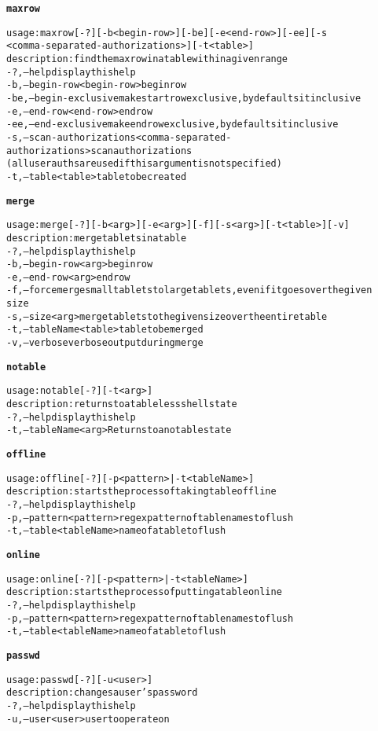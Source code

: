 \begin{alltt}
\textbf{maxrow}

    usage: maxrow [-?] [-b <begin-row>] [-be] [-e <end-row>] [-ee] [-s
              <comma-separated-authorizations>] [-t <table>]
    description: find the max row in a table within a given range
      -?,--help  display this help
      -b,--begin-row <begin-row>  begin row
      -be,--begin-exclusive  make start row exclusive, by defaults it inclusive
      -e,--end-row <end-row>  end row
      -ee,--end-exclusive  make end row exclusive, by defaults it inclusive
      -s,--scan-authorizations <comma-separated-authorizations>  scan authorizations
              (all user auths are used if this argument is not specified)
      -t,--table <table>  table to be created

\textbf{merge}

    usage: merge [-?] [-b <arg>] [-e <arg>] [-f] [-s <arg>] [-t <table>] [-v]
    description: merge tablets in a table
      -?,--help  display this help
      -b,--begin-row <arg>  begin row
      -e,--end-row <arg>  end row
      -f,--force  merge small tablets to large tablets, even if it goes over the given
              size
      -s,--size <arg>  merge tablets to the given size over the entire table
      -t,--tableName <table>  table to be merged
      -v,--verbose  verbose output during merge

\textbf{notable}

    usage: notable [-?] [-t <arg>]
    description: returns to a tableless shell state
      -?,--help  display this help
      -t,--tableName <arg>  Returns to a no table state

\textbf{offline}

    usage: offline [-?] [-p <pattern> | -t <tableName>]
    description: starts the process of taking table offline
      -?,--help  display this help
      -p,--pattern <pattern>  regex pattern of table names to flush
      -t,--table <tableName>  name of a table to flush

\textbf{online}

    usage: online [-?] [-p <pattern> | -t <tableName>]
    description: starts the process of putting a table online
      -?,--help  display this help
      -p,--pattern <pattern>  regex pattern of table names to flush
      -t,--table <tableName>  name of a table to flush

\textbf{passwd}

    usage: passwd [-?] [-u <user>]
    description: changes a user's password
      -?,--help  display this help
      -u,--user <user>  user to operate on


\end{alltt}
